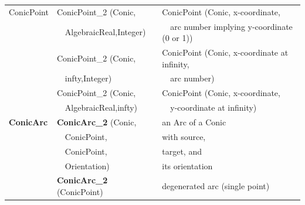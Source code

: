 \begin{tabular}{*{3}{| l} |}
ConicPoint    & ConicPoint\_2 (Conic,  
                        & ConicPoint (Conic, x-coordinate, \\
              & \ \ AlgebraicReal,Integer)  
                        & \ \ arc number implying y-coordinate (0 or 1)) \\
              & ConicPoint\_2 (Conic,          
                        & ConicPoint (Conic, x-coordinate at infinity, \\
              & \ \ infty,Integer) 
                        & \ \ arc number) \\
              & ConicPoint\_2 (Conic,    
                        & ConicPoint (Conic, x-coordinate, \\
              & \ \ AlgebraicReal,infty) 
                        & \ \ y-coordinate at infinity) \\ \hline



{\bf ConicArc}      & {\bf ConicArc\_2} (Conic,    & an Arc of a Conic \\
              & \ \ ConicPoint,                    & with source,\\
              & \ \ ConicPoint,                    & target, and\\
              & \ \ Orientation)                   & its orientation\\
              & {\bf ConicArc\_2} (ConicPoint)      & degenerated arc (single point) \\ \hline



\end{tabular}
